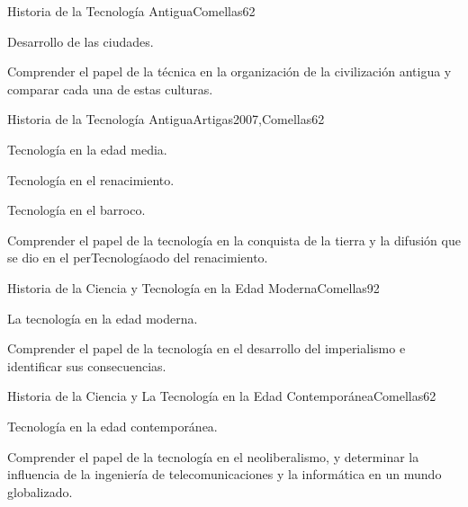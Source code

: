 \begin{syllabus}
\begin{unit}{Historia de la Tecnología Antigua}{Comellas}{6}{2}
\begin{topics}
    \item Desarrollo de las ciudades.
\end{topics}
\begin{unitgoals}
    \item Comprender el papel de la técnica en la organización de la civilización antigua y comparar cada una de estas culturas.
\end{unitgoals}
\end{unit}

\begin{unit}{Historia de la Tecnología Antigua}{Artigas2007,Comellas}{6}{2}
\begin{topics}
    \item Tecnología en la edad media.
    \item Tecnología en el renacimiento.
    \item Tecnología en el barroco.
\end{topics}
\begin{unitgoals}
    \item Comprender el  papel de la tecnología en la conquista de la tierra y la difusión que se dio en el perTecnologíaodo del renacimiento.
\end{unitgoals}

\end{unit}

\begin{unit}{Historia de la Ciencia y Tecnología en la Edad Moderna}{Comellas}{9}{2}
\begin{topics}
      \item {La tecnología en la edad moderna.}
\end{topics}
\begin{unitgoals}
	\item Comprender el  papel de la tecnología en el desarrollo del imperialismo e identificar sus consecuencias.
\end{unitgoals}
\end{unit}

\begin{unit}{Historia de la Ciencia y La Tecnología en la Edad Contemporánea}{Comellas}{6}{2}
\begin{topics}
      \item {Tecnología en la edad contemporánea.}
\end{topics}
\begin{unitgoals}
	\item Comprender el  papel de la tecnología en el neoliberalismo, y determinar la influencia de la ingeniería de telecomunicaciones y la informática en un mundo globalizado.
\end{unitgoals}
\end{unit}


\end{syllabus}
